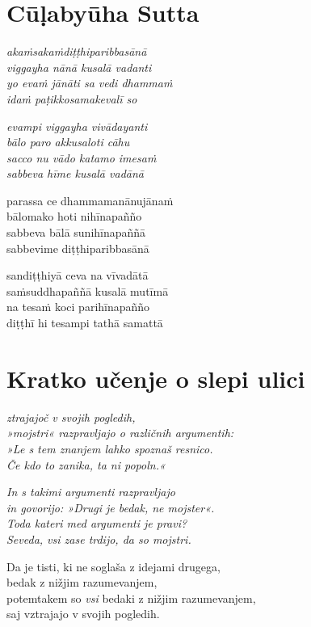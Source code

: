 

\cleartoverso
\chapter*{Cūḷabyūha Sutta}

\emph{akaṁsakaṁdiṭṭhiparibbasānā\\
viggayha nānā kusalā vadanti\\
yo evaṁ jānāti sa vedi dhammaṁ\\
idaṁ paṭikkosamakevalī so}

\emph{evampi viggayha vivādayanti\\
bālo paro akkusaloti cāhu}\\
\emph{sacco nu vādo katamo imesaṁ\\
sabbeva hīme kusalā vadānā}

parassa ce dhammamanānujānaṁ\\
bālomako hoti nihīnapañño\\
sabbeva bālā sunihīnapaññā\\
sabbevime diṭṭhiparibbasānā

sandiṭṭhiyā ceva na vīvadātā\\
saṁsuddhapaññā kusalā mutīmā\\
na tesaṁ koci parihīnapañño\\
diṭṭhī hi tesampi tathā samattā


\cleartorecto
\chapter{Kratko učenje o slepi ulici}

\emph{ztrajajoč v svojih pogledih,\\
»mojstri« razpravljajo o različnih argumentih:\\
»Le s tem znanjem lahko spoznaš resnico.\\
Če kdo to zanika, ta ni popoln.«}

\emph{In s takimi argumenti razpravljajo}\\
\emph{in govorijo: »Drugi je bedak, ne mojster«.}\\
\emph{Toda kateri med argumenti je pravi?}\\
\emph{Seveda, vsi zase trdijo, da so mojstri.}

Da je tisti, ki ne soglaša z idejami drugega,\\
bedak z nižjim razumevanjem,\\
potemtakem so \emph{vsi} bedaki z nižjim razumevanjem,\\
saj vztrajajo v svojih pogledih.

